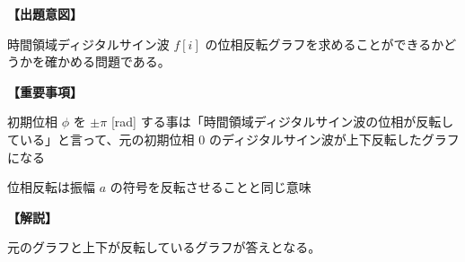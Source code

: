 \noindent \textbf{【出題意図】}

\noindent 時間領域ディジタルサイン波 $f[i]$ の位相反転グラフを求めることができるかどうかを確かめる問題である。

\vspace{1em}
\noindent \textbf{【重要事項】}

\bigskip
\noindent  初期位相 $\phi$ を $\pm\pi$ [rad] する事は「時間領域ディジタルサイン波の位相が反転している」と言って、元の初期位相 $0$ のディジタルサイン波が上下反転したグラフになる

\bigskip
\noindent  位相反転は振幅 $a$ の符号を反転させることと同じ意味


\vspace{1em}
\noindent \textbf{【解説】}

\noindent 元のグラフと上下が反転しているグラフが答えとなる。
